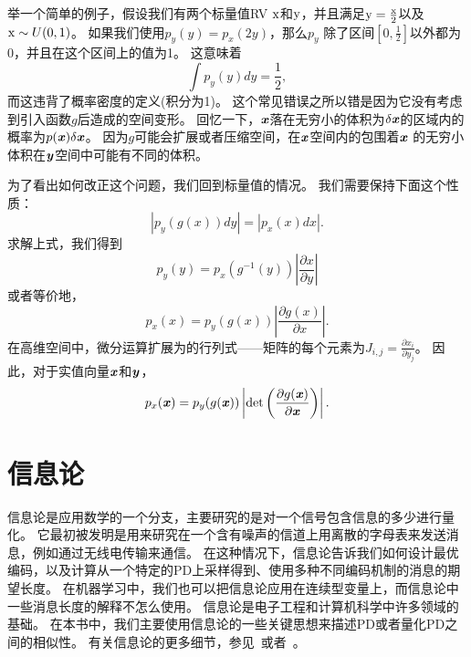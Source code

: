 举一个简单的例子，假设我们有两个标量值\gls{RV} $\mathrm{x}$和$\mathrm{y}$，并且满足$\mathrm{y}= \frac{\mathrm{x}}{2}$以及$\mathrm{x} \sim U(0, 1)$。
如果我们使用$p_y(y) = p_x(2y)$，那么$p_y$ 除了区间$[0, \frac{1}{2}]$以外都为0，并且在这个区间上的值为1。
这意味着
\begin{equation}
\int p_y(y)dy = \frac{1}{2},
\end{equation}
而这违背了概率密度的定义(积分为1)。
这个常见错误之所以错是因为它没有考虑到引入函数$g$后造成的空间变形。
回忆一下，$\boldsymbol{\mathit{x}}$落在无穷小的体积为$\delta \boldsymbol{\mathit{x}}$的区域内的概率为$p(\boldsymbol{\mathit{x}})\delta\boldsymbol{\mathit{x}}$。
因为$g$可能会扩展或者压缩空间，在$\boldsymbol{\mathit{x}}$空间内的包围着$\boldsymbol{\mathit{x}}$ 的无穷小体积在$\boldsymbol{\mathit{y}}$空间中可能有不同的体积。


为了看出如何改正这个问题，我们回到标量值的情况。
我们需要保持下面这个性质：
\begin{equation}
|p_y(g(x))dy| = |p_x(x)dx|.
\end{equation}
求解上式，我们得到
\begin{equation}
p_y(y) = p_x(g^{-1}(y)) \left \vert \frac{\partial x}{\partial y} \right \vert
\end{equation}
或者等价地，
\begin{equation}
p_x(x) = p_y(g(x)) \left | \frac{\partial g(x)}{\partial x} \right |.
\end{equation}
在高维空间中，微分运算扩展为的行列式——矩阵的每个元素为$J_{i, j} = \frac{\partial x_i}{\partial y_j}$。
因此，对于实值向量$\boldsymbol{\mathit{x}}$和$\boldsymbol{\mathit{y}}$，
\begin{equation}
\label{eqn:3.47}
p_x(\boldsymbol{\mathit{x}}) = p_y(g(\boldsymbol{\mathit{x}})) \left | \det \left ( \frac{\partial g(\boldsymbol{\mathit{x}})}{\partial \boldsymbol{\mathit{x}}} \right) \right |.
\end{equation}

\section{信息论}
\label{sec:information_theory}

信息论是应用数学的一个分支，主要研究的是对一个信号包含信息的多少进行量化。
它最初被发明是用来研究在一个含有噪声的信道上用离散的字母表来发送消息，例如通过无线电传输来通信。
在这种情况下，信息论告诉我们如何设计最优编码，以及计算从一个特定的\gls{PD}上采样得到、使用多种不同编码机制的消息的期望长度。
在机器学习中，我们也可以把信息论应用在连续型变量上，而信息论中一些消息长度的解释不怎么使用。
信息论是电子工程和计算机科学中许多领域的基础。
在本书中，我们主要使用信息论的一些关键思想来描述\gls{PD}或者量化\gls{PD}之间的相似性。
有关信息论的更多细节，参见~\cite{cover-book2006}或者~\cite{MacKay03}。

